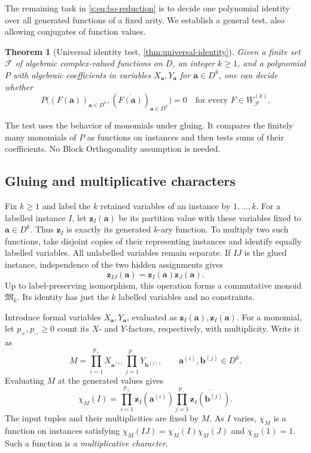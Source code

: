 \documentclass[11pt,letterpaper,onecolumn]{article}
\theoremstyle{plain}
\newtheorem{theorem}{Theorem}[section]
\theoremstyle{definition}
\theoremstyle{remark}
\newcommand{\cF}{\mathcal F}
\begin{document}
The remaining task in \eqref{s:eq:bo-reduction} is to decide one
polynomial identity over all generated functions of a fixed arity.
We establish a general test, also allowing conjugates of function values.

\begin{theorem}[Universal identity test, \cref{thm:universal-identity}]
\label{s:thm:identity}
Given a finite set $\cF$ of algebraic complex-valued functions on $D$,
an integer $k\ge1$, and a polynomial $P$ with algebraic coefficients
in variables $X_{\mathbf a},Y_{\mathbf a}$ for $\mathbf a\in D^k$,
one can decide whether
\[
 P\bigl((F(\mathbf a))_{\mathbf a\in D^k},
        (\overline{F(\mathbf a)})_{\mathbf a\in D^k}\bigr)=0
 \quad\text{for every }F\in W_{\cF}^{(k)}.
\]
\end{theorem}

The test uses the behavior of monomials under gluing. It compares the
finitely many monomials of $P$ as functions on instances and then tests
sums of their coefficients. No Block Orthogonality assumption is needed.

\subsection{Gluing and multiplicative characters}

Fix $k\ge1$ and label the $k$ retained variables of an instance by
$1,\ldots,k$. For a labelled instance $I$, let $\mathbf z_I(\mathbf a)$
be its partition value with these variables fixed to
$\mathbf a\in D^k$. Thus $\mathbf z_I$ is exactly its generated
$k$-ary function. To multiply two such functions, take disjoint copies
of their representing instances and identify equally labelled variables.
All unlabelled variables remain separate. If $IJ$ is the glued instance,
independence of the two hidden assignments gives
\[
 \mathbf z_{IJ}(\mathbf a)=\mathbf z_I(\mathbf a)\mathbf z_J(\mathbf a).
\]
Up to label-preserving isomorphism, this operation forms a commutative
monoid $\mathfrak M_k$. Its identity has just the $k$ labelled variables
and no constraints.

Introduce formal variables $X_{\mathbf a},Y_{\mathbf a}$, evaluated
as $\mathbf z_I(\mathbf a),\overline{\mathbf z_I(\mathbf a)}$.
For a monomial, let $p_+,p_-\ge0$ count its $X$- and $Y$-factors,
respectively, with multiplicity. Write it as
\[
 M=\prod_{i=1}^{p_+}X_{\mathbf a^{(i)}}
   \prod_{j=1}^{p_-}Y_{\mathbf b^{(j)}},
 \qquad \mathbf a^{(i)},\mathbf b^{(j)}\in D^k.
\]
Evaluating $M$ at the generated values gives
\[
 \chi_M(I)=\prod_{i=1}^{p_+}\mathbf z_I(\mathbf a^{(i)})
           \prod_{j=1}^{p_-}\overline{\mathbf z_I(\mathbf b^{(j)})}.
\]
The input tuples and their multiplicities are fixed by $M$.
As $I$ varies, $\chi_M$ is a function on instances satisfying
$\chi_M(IJ)=\chi_M(I)\chi_M(J)$ and $\chi_M(1)=1$.
Such a function is a \emph{multiplicative character}.
\end{document}
